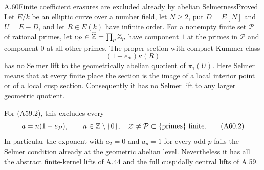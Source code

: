 \begin{statement}{A.60}{Finite coefficient erasures are excluded already by abelian Selmerness}{Proved}
Let $E/k$ be an elliptic curve over a number field, let $N\ge2$, put
$D=E[N]$ and $U=E-D$, and let $R\in E(k)$ have infinite order.
For a nonempty finite set $\mathcal P$ of rational primes, let
$e_{\mathcal P}\in\widehat{\mathbb Z}=\prod_p\mathbb Z_p$ have component $1$ at
the primes in $\mathcal P$ and component $0$ at all other primes.
The proper section with compact Kummer class
\[
 (1-e_{\mathcal P})\kappa(R)
 \tag{A60.1}
\]
has no Selmer lift to the geometrically abelian quotient of
$\pi_1(U)$. Here Selmer means that at every finite place the section
is the image of a local interior point or of a local cusp section.
Consequently it has no Selmer lift to any larger geometric quotient.

For (A59.2), this excludes every
\[
 a=n(1-e_{\mathcal P}),\qquad
 n\in\mathbb Z\setminus\{0\},\quad
 \varnothing\ne\mathcal P\subset\{\hbox{primes}\}\text{ finite}.
 \tag{A60.2}
\]
In particular the exponent with $a_2=0$ and $a_p=1$ for every odd
$p$ fails the Selmer condition already at the geometric abelian
level. Nevertheless it has all the abstract finite-kernel lifts
of A.44 and the full cuspidally central lifts of A.59.
\end{statement}
